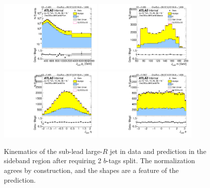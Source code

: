 \begin{figure}[htbp!]
\begin{center}
\includegraphics[angle=270, width=0.45\textwidth]{./figures/boosted/Sideband/b77_TwoTag_split_Sideband_sublHCand_Pt_m_1.pdf}
\includegraphics[angle=270, width=0.45\textwidth]{./figures/boosted/Sideband/b77_TwoTag_split_Sideband_sublHCand_Mass_s.pdf}\\
\includegraphics[angle=270, width=0.45\textwidth]{./figures/boosted/Sideband/b77_TwoTag_split_Sideband_sublHCand_Eta.pdf}
\includegraphics[angle=270, width=0.45\textwidth]{./figures/boosted/Sideband/b77_TwoTag_split_Sideband_sublHCand_Phi.pdf}
  \caption{Kinematics of the sub-lead large-$R$ jet in data and prediction in the sideband region after requiring 2 $b$-tags split. The normalization agrees by construction, and the shapes are a feature of the prediction.}
  \label{fig:boosted-2bs-sideband-ak10-subl}
\end{center}
\end{figure}

